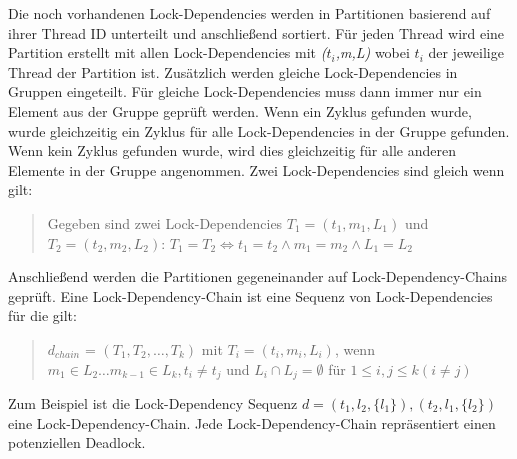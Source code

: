 Die noch vorhandenen Lock-Dependencies werden in Partitionen basierend auf ihrer
Thread ID unterteilt und anschließend sortiert. Für jeden Thread wird eine
Partition erstellt mit allen Lock-Dependencies mit \textit{($t_i$,m,L)} wobei
\textit{$t_i$} der jeweilige Thread der Partition ist. Zusätzlich werden gleiche
Lock-Dependencies in Gruppen eingeteilt. Für gleiche Lock-Dependencies muss dann
immer nur ein Element aus der Gruppe geprüft werden. Wenn ein Zyklus gefunden
wurde, wurde gleichzeitig ein Zyklus für alle Lock-Dependencies in der Gruppe
gefunden. Wenn kein Zyklus gefunden wurde, wird dies gleichzeitig für alle
anderen Elemente in der Gruppe angenommen. Zwei Lock-Dependencies sind gleich
wenn gilt:
\begin{quote}
  Gegeben sind zwei Lock-Dependencies \textit{$T_1 = (t_1, m_1, L_1)$} und
  \textit{$T_2 = (t_2, m_2, L_2)$}: $T_1 = T_2 \Leftrightarrow t_1 = t_2 \land
  m_1 = m_2 \land L_1 = L_2 $
\end{quote}
Anschließend werden die Partitionen gegeneinander auf Lock-Dependency-Chains
geprüft. Eine Lock-Dependency-Chain ist eine Sequenz von Lock-Dependencies für
die gilt:
\begin{quote}
  \textbf{$d_{chain}$} = $(T_1, T_2, \dots , T_k)$ mit $T_i = (t_i, m_i, L_i)$,
  wenn $m_1 \in L_2 \dots m_{k-1} \in L_k, t_i \neq t_j$ und $L_i \cap L_j =
  \emptyset$ für $1 \leq i, j \leq k (i \neq j)$
\end{quote}
Zum Beispiel ist die Lock-Dependency Sequenz \textit{$d = (t_1, l_2, \{l_1\}),
(t_2, l_1, \{l_2\})$} eine Lock-Dependency-Chain. Jede Lock-Dependency-Chain
repräsentiert einen potenziellen Deadlock.